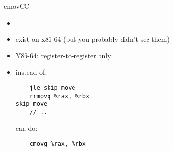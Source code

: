 \begin{frame}[fragile,label=cmovcc]{cmovCC}
    \begin{itemize}
    \item {}
    \item exist on x86-64 (but you probably didn't see them)
    \item Y86-64: register-to-register only
    \item instead of:
\begin{lstlisting}
    jle skip_move
    rrmovq %rax, %rbx
skip_move:
    // ...
\end{lstlisting}
    can do:
\begin{lstlisting}
    cmovg %rax, %rbx
\end{lstlisting}
    \end{itemize}
\end{frame}

